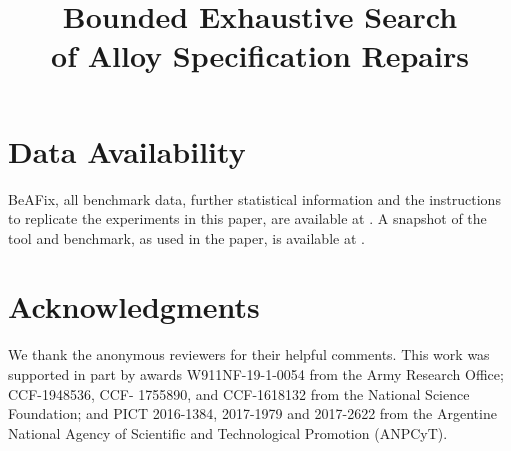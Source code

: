 \documentclass[10pt,conference]{IEEEtran}
\newcommand{\technique}{{\textsf BeAFix}}
\begin{document}
\title{Bounded Exhaustive Search \\ of Alloy Specification Repairs}

\author{
}

\maketitle






%











\section{Data Availability}
{\technique}, all benchmark data, further statistical information and the instructions to replicate the experiments in this paper, are available at \cite{beafix-site}. A snapshot of the tool and benchmark, as used in the paper, is available at \cite{beafix-snapshot}. 


\section*{Acknowledgments}
We thank the anonymous reviewers for their helpful comments. This work was supported in part by awards W911NF-19-1-0054 from the Army Research Office; CCF-1948536, CCF- 1755890, and CCF-1618132 from the National Science Foundation; and PICT 2016-1384, 2017-1979 and 2017-2622 from the Argentine National Agency of Scientific and Technological Promotion (ANPCyT).

\newpage



\end{document}
